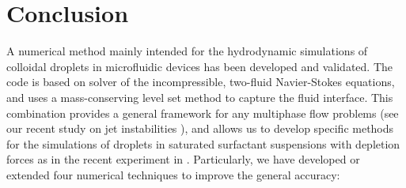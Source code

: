 \begin{figure}[t]
\centering
  \caption{}
  \label{fig: clusters}
\end{figure}




\section{Conclusion}
\label{sec: conclusion}


A numerical method mainly intended for the hydrodynamic simulations of colloidal droplets in microfluidic devices has been developed and validated. The code is based on  solver of the incompressible, two-fluid Navier-Stokes equations, and uses a mass-conserving level set method to capture the fluid interface. This combination provides a general framework for any multiphase flow problems (see \eg our recent study on jet instabilities \cite{Loiseau_PRF_2016}), and allows us to develop specific methods for the simulations of droplets in saturated surfactant suspensions with depletion forces as in the recent experiment in \cite{Shen_AS_2016}. Particularly, we have developed or extended four numerical techniques to improve the general accuracy:

